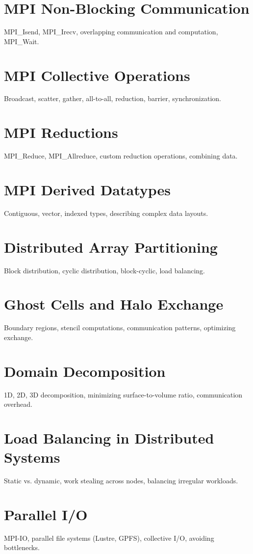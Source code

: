 \chapter{MPI Non-Blocking Communication}
MPI\_Isend, MPI\_Irecv, overlapping communication and computation, MPI\_Wait.

\chapter{MPI Collective Operations}
Broadcast, scatter, gather, all-to-all, reduction, barrier, synchronization.

\chapter{MPI Reductions}
MPI\_Reduce, MPI\_Allreduce, custom reduction operations, combining data.

\chapter{MPI Derived Datatypes}
Contiguous, vector, indexed types, describing complex data layouts.

\chapter{Distributed Array Partitioning}
Block distribution, cyclic distribution, block-cyclic, load balancing.

\chapter{Ghost Cells and Halo Exchange}
Boundary regions, stencil computations, communication patterns, optimizing exchange.

\chapter{Domain Decomposition}
1D, 2D, 3D decomposition, minimizing surface-to-volume ratio, communication overhead.

\chapter{Load Balancing in Distributed Systems}
Static vs. dynamic, work stealing across nodes, balancing irregular workloads.

\chapter{Parallel I/O}
MPI-IO, parallel file systems (Lustre, GPFS), collective I/O, avoiding bottlenecks.

